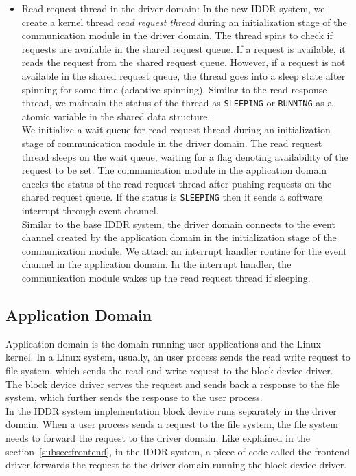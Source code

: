 \begin{itemize}
\item Read request thread in the driver domain:
In the new IDDR system, we create a kernel thread \textit{read request thread} during an initialization stage of the communication module in the driver domain. The thread spins to check if requests are available in the shared request queue. If a request is available, it reads the request from the shared request queue. However, if a request is not available in the shared request queue, the thread goes into a sleep state after spinning for some time (adaptive spinning). Similar to the read response thread, we maintain the status of the thread as \texttt{SLEEPING} or \texttt{RUNNING} as a atomic variable in the shared data structure. 
\\[3mm]
We initialize a wait queue for read request thread during an initialization stage of communication module in the driver domain. The read request thread sleeps on the wait queue, waiting for a flag denoting availability of the request to be set. The communication module in the application domain checks the status of the read request thread after pushing requests on the shared request queue. If the status is \texttt{SLEEPING} then it sends a software interrupt through event channel.
\\[3mm]
Similar to the base IDDR system, the driver domain connects to the event channel created by the application domain in the initialization stage of the communication module. We attach an interrupt handler routine for the event channel in the application domain. In the interrupt handler, the communication module wakes up the read request thread if sleeping. 
\end{itemize}

\subsection{Application Domain}

Application domain is the domain running user applications and the Linux kernel. In a Linux system, usually, an user process sends the read write request to file system, which sends the read and write request to the block device driver. The block device driver serves the request and sends back a response to the file system, which further sends the response to the user process. 
\\[3mm]
In the IDDR system implementation block device runs separately in the driver domain. When a user process sends a request to the file system, the file system needs to forward the request to the driver domain. Like explained in the section~\ref{subsec:frontend}, in the IDDR system, a piece of code called the frontend driver forwards the request to the driver domain running the block device driver. 

